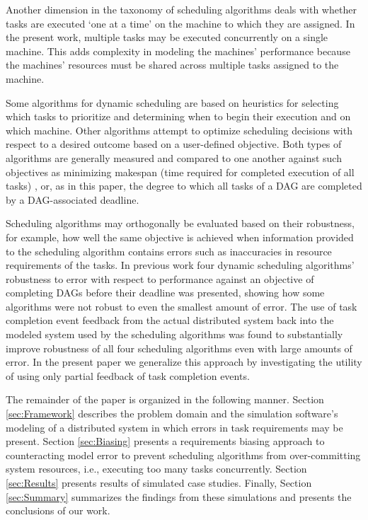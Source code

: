 \documentclass[10pt]{csce}
\begin{document}
Another dimension in the taxonomy of scheduling algorithms deals with whether
tasks are executed `one at a time' on the machine to which they are assigned.
In the present work, multiple tasks may be executed concurrently on a single
machine. This adds complexity in modeling the machines' performance because
the machines' resources must be shared across multiple tasks assigned to the
machine.

Some algorithms for dynamic scheduling are based on heuristics for selecting
which tasks to prioritize and determining when to begin their execution and on
which machine. Other algorithms attempt to optimize scheduling decisions with
respect to a desired outcome based on a user-defined objective.  Both types of
algorithms are generally measured and compared to one another against such
objectives as minimizing makespan (time required for completed execution
of all tasks) \cite{stochastic}, or, as in this paper, the degree to which all
tasks of a DAG are completed by a DAG-associated deadline.

Scheduling algorithms may orthogonally be evaluated based on their robustness,
for example, how well the same objective is achieved when information provided
to the scheduling algorithm contains errors such as inaccuracies in resource
requirements of the tasks.  In previous work \cite{pdpta18} four dynamic
scheduling algorithms' robustness to error with respect to performance against
an objective of completing DAGs before their deadline was presented, showing
how some algorithms were not robust to even the smallest amount of error. The
use of task completion event feedback from the actual distributed system back
into the modeled system used by the scheduling algorithms was found to
substantially improve robustness of all four scheduling algorithms even with
large amounts of error. In the present paper we generalize this approach by
investigating the utility of using only partial feedback of task completion
events.

The remainder of the paper is organized in the following manner.  Section
\ref{sec:Framework} describes the problem domain and the simulation software's
modeling of a distributed system in which errors in task requirements may
be present.  Section \ref{sec:Biasing} presents a requirements biasing approach
to counteracting model error to prevent scheduling algorithms from
over-committing system resources, i.e., executing too many tasks concurrently.
Section \ref{sec:Results} presents results of simulated case studies.
Finally, Section \ref{sec:Summary} summarizes the findings from these
simulations and presents the conclusions of our work.
\end{document}
